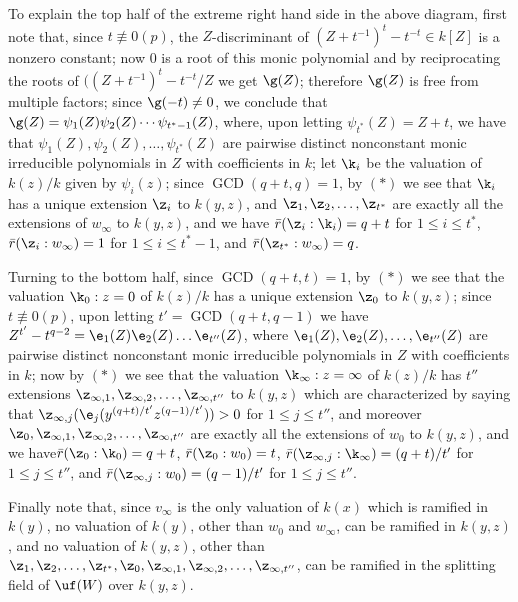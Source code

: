 To explain the top half of the extreme right hand side in 
the above diagram,
first note that, since $t\not\equiv 0(p)$, the 
$Z$-discriminant of 
$(Z+t^{-1})^t-t^{-t}\in k[Z]$ is a nonzero constant; now 
$0$ is a root of this
monic polynomial and by reciprocating the roots of  
$((Z+t^{-1})^t-t^{-t}/Z$ we get $\g(Z)$; therefore $\g(Z)$ 
is 
free from multiple factors; since $\g(-t)\ne 0$, we 
conclude that 
$\g(Z)=\psi_1(Z)\psi_2(Z)\dotsb\psi_{t^*-1}(Z)$, where, 
upon letting 
$\psi_{t^*}(Z)=Z+t$, we have that 
$\psi_1(Z),\psi_2(Z),\dots,\psi_{t^*}(Z)$ 
are pairwise distinct nonconstant monic 
irreducible polynomials in $Z$ with coefficients in $k$; 
let $\k_i$ be the
valuation of $k(z)/k$ given by $\psi_i(z)$; since 
$\operatorname{GCD}(q+t,q)=1$,
by $(\ast)$ we
see that $\k_i$ has a unique extension $\z_i$ to $k(y,z)$, 
and
$\z_1,\z_2,\dots,\z_{t^*}$ are exactly all the extensions 
of $w_{\infty}$ to 
$k(y,z)$, and we have $\bar r(\z_i:\k_i)=q+t$ for $1\le 
i\le t^*$,
$\bar r(\z_i:w_{\infty})=1$ for $1\le i\le t^*-1$,
and $\bar r(\z_{t^*}:w_{\infty})=q$. 

Turning to the bottom half, since $\operatorname{GCD}(q+
t,t)=1$, by $(\ast)$ we see that the
valuation $\k_0:z=0$ of $k(z)/k$ has a unique extension 
$\z_0$ to $k(y,z)$;
since $t\not\equiv 0(p)$, upon letting 
$t'=\operatorname{GCD}(q+t,q-1)$ we have
$Z^{t'}-t^{q-2}=\e_1(Z)\e_2(Z)\dots\e_{t''}(Z)$, where
$\e_1(Z),\e_2(Z),\dots,\e_{t''}(Z)$ are pairwise distinct 
nonconstant monic
irreducible polynomials in $Z$ with coefficients in $k$; 
now by $(\ast)$
we see that the valuation $\k_{\infty}:z=\infty$ of 
$k(z)/k$ has $t''$
extensions 
$\z_{\infty,1},\z_{\infty,2},\dots,\z_{\infty,t''}$ to 
$k(y,z)$
which are characterized by saying that
$\z_{\infty,j}(\e_j(y^{(q+t)/t'}z^{(q-1)/t'}))>0$ for
$1\le j \le t''$, and moreover
$\z_0,\z_{\infty,1}, \z_{\infty,2},\dots,\z_{\infty,t''}$ 
are exactly all the extensions of $w_0$ to $k(y,z)$, and we 
have$\bar r(\z_0:\k_0)=q+t$, $\bar r(\z_0:w_0)=t$, 
$\bar r(\z_{\infty,j}:\k_{\infty})=(q+t)/t'$ for $1\le 
j\le t
''$, and $\bar r(\z_{\infty,j}:w_0)=(q-1)/t'$ for $1\le 
j\le t''$.

Finally note that, since $v_{\infty}$ is the only 
valuation of $k(x)$ which
is ramified in $k(y)$, no valuation of $k(y)$, other than 
$w_0$ and 
$w_{\infty}$, can be ramified in $k(y,z)$, and no 
valuation of $k(y,z)$,
other than 
$\z_1,\z_2,\dots,\z_{t^*},\z_0,\z_{\infty,1}, \z_{\infty,2},
\dots,\z_{\infty,t''}$,
can be ramified in the splitting field of $\uf(W)$ over 
$k(y,z)$.

